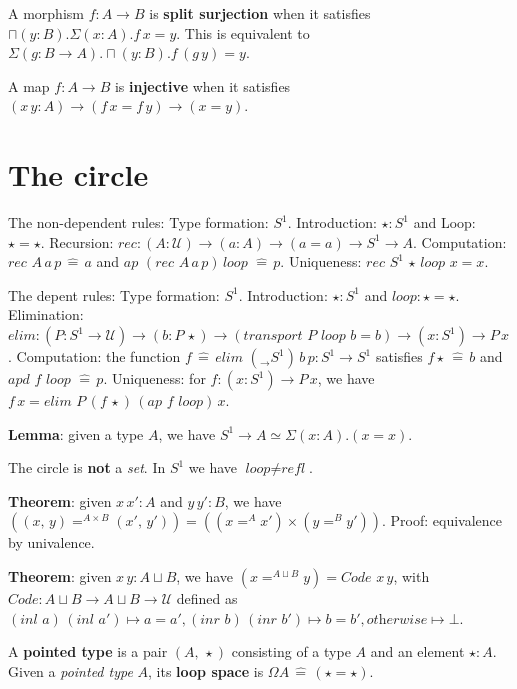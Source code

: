 \documentclass[a4paper]{article}
\begin{document}
A morphism $f : A \to B$ is \textbf{split surjection} when it satisfies $\sqcap (y : B). \Sigma(x : A). f \, x = y$. This is equivalent to $\Sigma(g : B \to A).\sqcap(y : B). f \, (g \, y) = y$.

A map $f : A \to B$ is \textbf{injective} when it satisfies $(x \, y : A) \to (f \, x = f \, y) \to (x = y)$.

\section*{The circle}

The non-dependent rules: Type formation: $S^1$. Introduction: $\star : S^1$ and Loop: $\star = \star$. Recursion: $\textit{rec} : (A : \mathcal{U}) \to (a : A) \to (a = a) \to S^1 \to A$. Computation: $\textit{rec } A \, a \, p \, \hat{=} \, a$ and $\textit{ap } (\textit{rec } A \, a \, p) \, \textit{loop } \hat{=} \, p$. Uniqueness: $\textit{rec } S^1 \, \star \, \textit{loop } x = x$.

The depent rules: Type formation: $S^1$. Introduction: $\star : S^1$ and $\textit{loop} : \star = \star$. Elimination: $\textit{elim} : (P : S^1 \to \mathcal{U}) \to (b : P \, \star) \to (\textit{transport } P \textit{ loop } b = b) \to (x : S^1) \to P \, x$. Computation: the function $f \, \hat{=} \, \textit{elim } (_ \to S^1) \, b \, p : S^1 \to S^1$ satisfies $f \star \, \hat{=} \, b$ and $\textit{apd } f \textit{ loop } \hat{=} \, p$. Uniqueness: for $f : (x : S^1) \to P \, x$, we have $f \, x = \textit{elim } P \, (f \, \star) \, (\textit{ap } f \textit{ loop}) \, x$.

\textbf{Lemma}: given a type $A$, we have $S^1 \to A \simeq \Sigma(x : A).(x = x)$.

The circle is \textbf{not} a \textit{set}. In $S^1$ we have $\textit{loop} \bm{\neq} \textit{refl}$.

\textbf{Theorem}: given $x \, x' : A$ and $y \, y' : B$, we have $((x, \, y) =^{A \times B} (x', \, y')) = ((x =^A x') \times (y =^B y'))$. Proof: equivalence by univalence.

\textbf{Theorem}: given $x \, y : A \sqcup B$, we have $(x =^{A \sqcup B} y) = \textit{Code } x \, y$, with $\textit{Code} : A \sqcup B \to A \sqcup B \to \mathcal{U}$ defined as $(\textit{inl } a) \, (\textit{inl } a') \mapsto a = a', (\textit{inr } b) \, (\textit{inr } b') \mapsto b = b', \textit{otherwise} \mapsto \bot$.

A \textbf{pointed type} is a pair $(A, \, \star)$ consisting of a type $A$ and an element $\star: A$. Given a \textit{pointed type} $A$, its \textbf{loop space} is $\Omega A \, \hat{=} \, (\star = \star)$.
\end{document}
